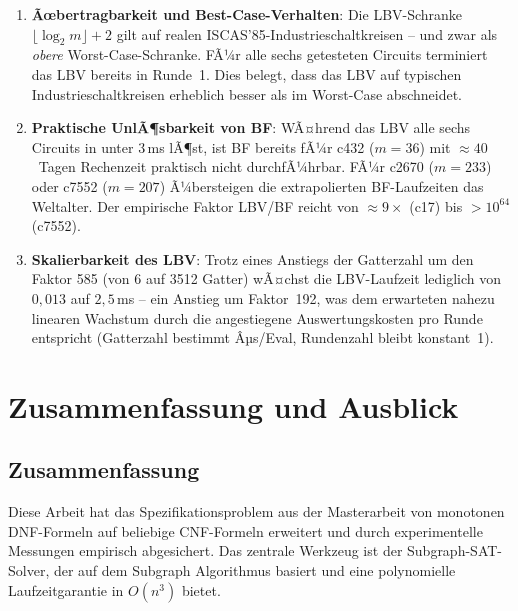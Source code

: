 ﻿\documentclass[a4paper,12pt]{article}
\theoremstyle{definition}
\begin{document}
\begin{enumerate}
  \item \textbf{Ãœbertragbarkeit und Best-Case-Verhalten}: Die
    LBV-Schranke $\lfloor\log_2 m\rfloor + 2$ gilt auf realen
    ISCAS'85-Industrieschaltkreisen -- und zwar als \emph{obere}
    Worst-Case-Schranke.  FÃ¼r alle sechs getesteten Circuits terminiert
    das LBV bereits in Runde~1.  Dies belegt, dass das LBV auf typischen
    Industrieschaltkreisen erheblich besser als im Worst-Case abschneidet.

  \item \textbf{Praktische UnlÃ¶sbarkeit von BF}: WÃ¤hrend das LBV
    alle sechs Circuits in unter $3$\,ms lÃ¶st, ist BF bereits fÃ¼r
    c432 ($m=36$) mit ${\approx}40$~Tagen Rechenzeit praktisch
    nicht durchfÃ¼hrbar.  FÃ¼r c2670 ($m=233$) oder c7552 ($m=207$)
    Ã¼bersteigen die extrapolierten BF-Laufzeiten das Weltalter.
    Der empirische Faktor LBV/BF reicht von ${\approx}9\times$ (c17)
    bis $> 10^{64}$ (c7552).

  \item \textbf{Skalierbarkeit des LBV}: Trotz eines Anstiegs der
    Gatterzahl um den Faktor 585 (von 6 auf 3512 Gatter) wÃ¤chst die
    LBV-Laufzeit lediglich von $0{,}013$ auf $2{,}5$\,ms -- ein Anstieg
    um Faktor~192, was dem erwarteten nahezu linearen Wachstum durch die
    angestiegene Auswertungskosten pro Runde entspricht (Gatterzahl
    bestimmt Âµs/Eval, Rundenzahl bleibt konstant~1).
\end{enumerate}

\section{Zusammenfassung und Ausblick}

\subsection{Zusammenfassung}

Diese Arbeit hat das Spezifikationsproblem aus der Masterarbeit \cite{Epp13} von
monotonen DNF-Formeln auf beliebige CNF-Formeln erweitert und durch experimentelle
Messungen empirisch abgesichert.  Das zentrale Werkzeug ist der Subgraph-SAT-Solver,
der auf dem Subgraph Algorithmus \cite{Epp26, Epp26} basiert und eine polynomielle
Laufzeitgarantie in $O(n^3)$ bietet.
\end{document}
